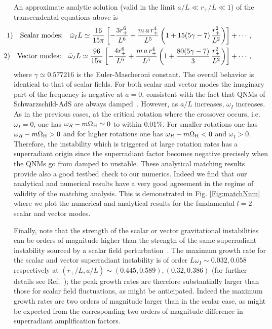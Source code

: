 \documentclass[11pt]{article}
\numberwithin{equation}{section} %
\begin{document}
An approximate analytic solution (valid in the limit $a/L\ll r_+/L \ll 1$) of the transcendental equations above is
%
\begin{eqnarray}
&&  \hspace{-1.7cm} 1) \quad \hbox{Scalar modes:} \quad  \tilde{\omega}_I  L\simeq \frac{16 }{15 \pi }\left[-\frac{3 r_+^6}{L^6}+\frac{ m \,a \,r_+^4}{L^5}\left(1+15 (5 \gamma -7) \,\frac{r_+^2}{L^2}\right)\right] +\cdots \,, \label{SnormalM}
\\ 
&& \hspace{-1.7cm}  2) \quad \hbox{Vector modes:} \quad  \tilde{\omega}_I  L\simeq \frac{96}{15 \pi }\left[-\frac{4 r_+^6}{L^6}+\frac{m\, a\, r_+^4}{L^5}\left(1+\frac{80 (5 \gamma -7)}{3}\,\frac{r_+^2}{L^2}\right)\right] +\cdots \,,\label{VnormalM}   
\end{eqnarray}
%
where $\gamma\simeq 0.577216$ is the Euler-Mascheroni constant. The overall behavior is identical to that of scalar fields. For both scalar and vector modes the imaginary part of the frequency is negative at $a=0$, consistent with the fact that QNMs of Schwarzschild-AdS are always damped~\cite{Berti:2009kk,Cardoso:2001bb}. However, as $a/L$ increases, $\omega_I$ increases. As in the previous cases, at the critical rotation where the crossover occurs, i.e. $\omega_I=0$, one has $\omega_R-m\Omega_{\rm H}\simeq 0$ to within $0.01\%$. For smaller rotations one has  $\omega_R-m\Omega_{\rm H}>0$ and for higher rotations one has  $\omega_R-m\Omega_{\rm H}<0$ and $\omega_I>0$. Therefore, the instability which is triggered at large rotation rates has a superradiant origin since the superradiant factor becomes negative precisely when the QNMs go from damped to unstable.
These analytical matching results provide also a good testbed check to our numerics. Indeed we find that our analytical and numerical results have a very good agreement in the regime of validity of the matching analysis. This is demonstrated  in Fig. \ref{Fig:matchNum} where we plot the numerical and analytical results for the fundamental $l=2$ scalar and vector modes. 


Finally, note that the strength of the scalar or vector gravitational instabilities can be orders of magnitude higher than the strength of the same superradiant instability sourced by a scalar field perturbation~\cite{Cardoso:2004hs,Uchikata:2009zz,Sullivan:2017agx}.
The maximum growth rate for the scalar and vector superradiant instability is of order $L\omega_I \sim 0.032, 0.058$ respectively at $(r_+/L,a/L)\sim (0.445,0.589), (0.32,0.386)$ (for further details see Ref.~\cite{Cardoso:2013pza}); the peak growth rates are therefore
substantially larger than those for scalar field fluctuations, as might be anticipated. Indeed the maximum growth rates are two orders of magnitude larger than in the scalar case, as might be expected
from the corresponding two orders of magnitude difference in superradiant amplification factors.
\end{document}
